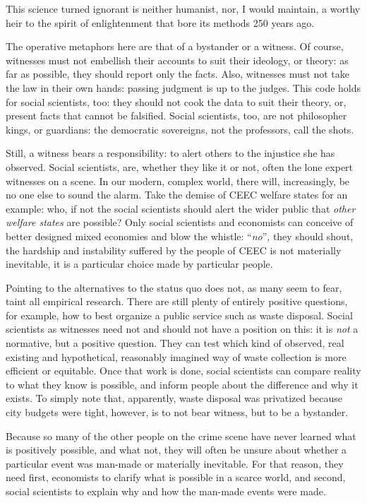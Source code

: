 \documentclass[11pt,a4paper,oneside]{article}
\begin{document}
This science turned ignorant is neither humanist, nor, I would maintain, a worthy heir to the spirit of enlightenment that bore its methods 250 years ago.

The operative metaphors here are that of a bystander or a witness.
Of course, witnesses must not embellish their accounts to suit their ideology, or theory:
as far as possible, they should report only the facts.
Also, witnesses must not take the law in their own hands:
passing judgment is up to the judges.
This code holds for social scientists, too:
they should not cook the data to suit their theory, or, present facts that cannot be falsified.
Social scientists, too, are not philosopher kings, or guardians:
the democratic sovereigns, not the professors, call the shots.

Still, a witness bears a responsibility:
to alert others to the injustice she has observed.
Social scientists, are, whether they like it or not, often the lone expert witnesses on a scene.
In our modern, complex world, there will, increasingly, be no one else to sound the alarm.
Take the demise of \gls{CEEC} welfare states for an example:
who, if not the social scientists should alert the wider public that \emph{other welfare states} are possible?
Only social scientists and economists can conceive of better designed mixed economies and blow the whistle:
``\emph{no}'', they should shout, the hardship and instability suffered by the people of \gls{CEEC} is not materially inevitable, it is a particular choice made by particular people.


Pointing to the alternatives to the status quo does not, as many seem to fear, taint all empirical research.
There are still plenty of entirely positive questions, for example, how to best organize a public service such as waste disposal.
Social scientists as witnesses need not and should not have a position on this:
it is \emph{not} a normative, but a positive question.
They can test which kind of observed, real existing and hypothetical, reasonably imagined way of waste collection is more efficient or equitable.
Once that work is done, social scientists can compare reality to what they know is possible, and inform people about the difference and why it exists.
To simply note that, apparently, waste disposal was privatized because city budgets were tight, however, is to not bear witness, but to be a bystander.

Because so many of the other people on the crime scene have never learned what is positively possible, and what not, they will often be unsure about whether a particular event was man-made or materially inevitable.
For that reason, they need first, economists to clarify what is possible in a scarce world, and second, social scientists to explain why and how the man-made events were made.
\end{document}
